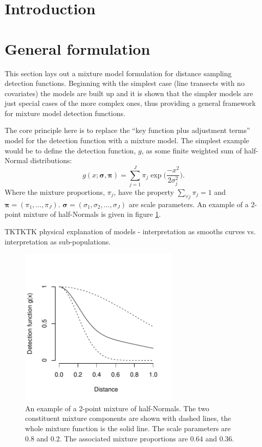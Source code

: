 \section{Introduction}







\section{General formulation}

This section lays out a mixture model formulation for distance sampling detection functions. Beginning with the simplest case (line transects with no covariates) the models are built up and it is shown that the simpler models are just special cases of the more complex ones, thus providing a general framework for mixture model detection functions.

The core principle here is to replace the ``key function plus adjustment terms'' model for the detection function with a mixture model. The simplest example would be to define the detection function, $g$, as some finite weighted sum of half-Normal distributions:
\begin{equation}
g(x;\bm{\sigma},\bm{\pi}) = \sum_{j=1}^J \pi_j \exp \Big( \frac{-x^2}{2 \sigma_j^2}\Big).
\label{mmds-simplemix}
\end{equation}
Where the mixture proportions, $\pi_j$, have the property $\sum_{\forall j}\pi_j=1$ and $\bm{\pi} = (\pi_1, \dots, \pi_J)$. $\bm{\sigma}=(\sigma_1,\sigma_2,\dots,\sigma_J)$ are scale parameters. An example of a 2-point mixture of half-Normals is given in figure \ref{2ptdia}.

TKTKTK physical explanation of models - interpretation as smooths curves vs. interpretation as sub-populations.

\begin{figure}
\centering
\includegraphics[width=3in]{mix/figs/2ptdia.pdf}
\caption{An example of a 2-point mixture of half-Normals. The two constituent mixture components are shown with dashed lines, the whole mixture function is the solid line. The scale parameters are $0.8$ and $0.2$. The associated mixture proportions are $0.64$ and $0.36$.}
\label{2ptdia}
\end{figure}

